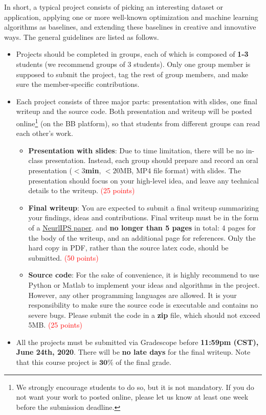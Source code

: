 \documentclass[10pt]{article}
\begin{document}
In short, a typical project consists of picking an interesting dataset or application, applying
one or more well-known optimization and machine learning algorithms as baselines, and extending
these baselines in creative and innovative ways. The general guidelines are listed as follows.
\begin{itemize}
	\item Projects should be completed in groups, each of which is composed of \textbf{1-3} students (we recommend groups of 3 students).
	      Only one group member is supposed to submit the project, tag the rest of group members,
	      and make sure the member-specific contributions.
	\item Each project consists of three major parts: presentation with slides, one final writeup and the source code.
	      Both presentation and writeup will be posted online\footnote{\footnotesize We strongly encourage students to do so, but it is not mandatory.
		      If you do not want your work to posted online,
		      please let us know at least one week before the submission deadline.}
	      (on the BB platform), so that students from different groups
	      can read each other's work.
	      \begin{itemize}
		      \item \textbf{Presentation with slides}: Due to time limitation, there will be no in-class presentation.
		            Instead, each group should prepare and record an oral presentation (\textbf{$< 3$min}, $< 20$MB, MP4 file format) with slides.
		            The presentation should focus on your high-level idea, and leave any technical details to the writeup. \textcolor{red}{(25 points)}
		      \item \textbf{Final writeup}: You are expected to submit a final writeup summarizing your findings,
		            ideas and contributions. Final writeup must be in the form of a \href{https://neurips.cc/Conferences/2020/PaperInformation/StyleFiles}{NeurlIPS paper}.
		            and \textbf{no longer than 5 pages} in total: 4 pages for the body of the writeup, and an additional page for references.
		            Only the hard copy in PDF, rather than the source latex code, should be submitted. \textcolor{red}{(50 points)}
		      \item \textbf{Source code}: For the sake of convenience, it is highly recommend to use Python or Matlab to implement your ideas and algorithms in the project.
		            However, any other programming languages are allowed. It is your responsibility to make sure the source code is executable and contains no severe bugs.
		            Please submit the code in a \textbf{zip} file, which should not exceed 5MB.
		            \textcolor{red}{(25 points)}
	      \end{itemize}
	\item All the projects must be submitted via Gradescope before \textbf{11:59pm (CST), June 24th, 2020}.
	      There will be \textbf{no late days} for the final writeup. Note that this course project is $\mathbf{30\%}$ of the final grade.
\end{itemize}
\end{document}
